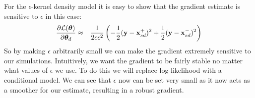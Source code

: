 \documentclass[]{article}
\begin{document}
For the $\epsilon$-kernel density model
it is easy to show that the gradient estimate is sensitive to $\epsilon$ in this case: 
\begin{eqnarray}
  \frac{\partial \mathcal{L}({\bm \theta})}{\partial {\bm \theta}_d} & \approx & \frac{1}{2c\epsilon^2}\left( -\frac{1}{2}({\bf y}-{\bf x}^{+}_{sd})^2 + \frac{1}{2}({\bf y}-{\bf x}^{-}_{sd})^2  \right)
\end{eqnarray}
So by making $\epsilon$ arbitrarily small we can make the gradient extremely sensitive to our simulations.  Intuitively, we want the gradient to be fairly stable no matter what values of $\epsilon$ we use.  To do this we will replace log-likelihood with a conditional model.
%
We can see that $\epsilon$ now can be set very small as it now acts as a smoother for our estimate, resulting in a robust gradient.
 
\end{document}
